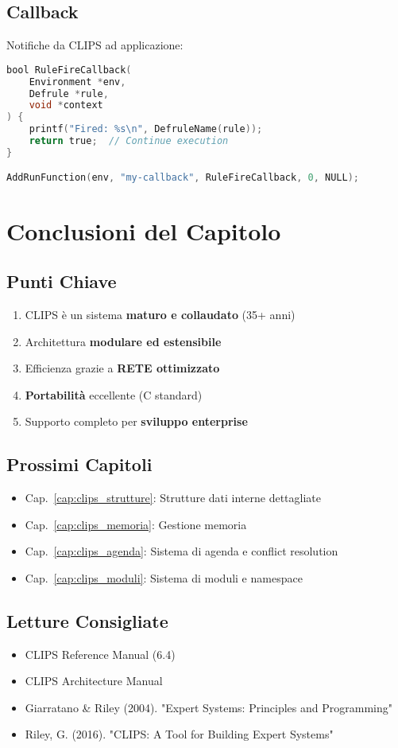 \subsection{Callback}

Notifiche da CLIPS ad applicazione:

\begin{lstlisting}[language=C]
bool RuleFireCallback(
    Environment *env,
    Defrule *rule,
    void *context
) {
    printf("Fired: %s\n", DefruleName(rule));
    return true;  // Continue execution
}

AddRunFunction(env, "my-callback", RuleFireCallback, 0, NULL);
\end{lstlisting}

\section{Conclusioni del Capitolo}

\subsection{Punti Chiave}

\begin{enumerate}
\item CLIPS è un sistema \textbf{maturo e collaudato} (35+ anni)
\item Architettura \textbf{modulare ed estensibile}
\item Efficienza grazie a \textbf{RETE ottimizzato}
\item \textbf{Portabilità} eccellente (C standard)
\item Supporto completo per \textbf{sviluppo enterprise}
\end{enumerate}

\subsection{Prossimi Capitoli}

\begin{itemize}
\item Cap.~\ref{cap:clips_strutture}: Strutture dati interne dettagliate
\item Cap.~\ref{cap:clips_memoria}: Gestione memoria
\item Cap.~\ref{cap:clips_agenda}: Sistema di agenda e conflict resolution
\item Cap.~\ref{cap:clips_moduli}: Sistema di moduli e namespace
\end{itemize}

\subsection{Letture Consigliate}

\begin{itemize}
\item CLIPS Reference Manual (6.4)
\item CLIPS Architecture Manual
\item Giarratano \& Riley (2004). "Expert Systems: Principles and Programming"
\item Riley, G. (2016). "CLIPS: A Tool for Building Expert Systems"
\end{itemize}
